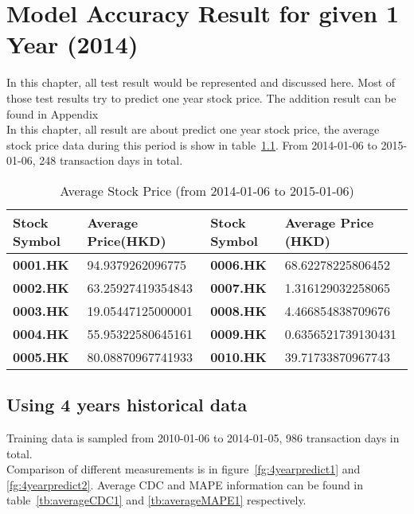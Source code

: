 \chapter{Model Accuracy Result for given 1 Year (2014)}
\label{ch:AccuracyResult}
In this chapter, all test result would be represented and discussed here. Most of those test results try to predict one year stock price. The addition result can be found in Appendix~\\


In this chapter, all result are about predict one year stock price, the average stock price data during this period is show in table~\ref{tb:avg20142015}. From 2014-01-06 to 2015-01-06, 248 transaction days in total.

\begin{table}[h]
	\centering
	\begin{tabular}{|l|l|l|l|}
		\hline
		\textbf{Stock Symbol} & \textbf{Average Price(HKD)} & \textbf{Stock Symbol} & \textbf{Average Price (HKD)} \\ \hline
		\textbf{0001.HK}      & 94.9379262096775       & \textbf{0006.HK}      & 68.62278225806452      \\ \hline
		\textbf{0002.HK}      & 63.25927419354843      & \textbf{0007.HK}      & 1.316129032258065      \\ \hline
		\textbf{0003.HK}      & 19.05447125000001      & \textbf{0008.HK}      & 4.466854838709676      \\ \hline
		\textbf{0004.HK}      & 55.95322580645161      & \textbf{0009.HK}      & 0.6356521739130431     \\ \hline
		\textbf{0005.HK}      & 80.08870967741933      & \textbf{0010.HK}      & 39.71733870967743      \\ \hline
	\end{tabular}
	\caption{Average Stock Price (from 2014-01-06 to 2015-01-06)}
	\label{tb:avg20142015}
\end{table}

\section{Using 4 years historical data}

Training data is sampled from 2010-01-06 to 2014-01-05, 986 transaction days in total.\\


Comparison of different measurements is in figure~\ref{fg:4yearpredict1} and \ref{fg:4yearpredict2}. Average CDC and MAPE information can be found in table~\ref{tb:averageCDC1} and \ref{tb:averageMAPE1} respectively.\\

